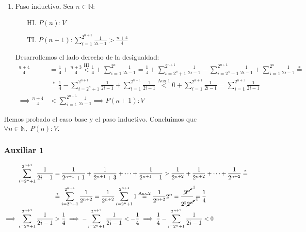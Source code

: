 \begin{enumerate}[label=\roman*)]
\begin{enumerate}[label=\arabic*)]
        \item Paso inductivo. Sea $n \in \mathbb{N}$:
        \begin{enumerate}
            \item[HI.] $P(n): V$
            \item[TI.] $P(n+1): \displaystyle \sum_{i=1}^{2^{n+1}} \frac{1}{2i-1} > \frac{n+4}{4}$ 
        \end{enumerate}

        Desarrollemos el lado derecho de la desigualdad:
        \begin{align*}
            \frac{n+4}{4} &= \frac{1}{4} + \frac{n+3}{4} \overset{\text{HI}}{<} \frac{1}{4} + \sum_{i=1}^{2^n} 
            \frac{1}{2i-1} = \frac{1}{4} + \sum_{i=2^n + 1}^{2^{n+1}} \frac{1}{2i-1} - \sum_{i=2^n + 1}^{2^{n+1}} 
            \frac{1}{2i-1} + \sum_{i=1}^{2^n} \frac{1}{2i-1} \overset{*}{=} \\
            &\overset{*}{=} \frac{1}{4} - \sum_{i=2^n + 1}^{2^{n+1}} \frac{1}{2i-1} + \sum_{i=1}^{2^{n+1}} 
            \frac{1}{2i-1} \overset{\text{Aux.1}}{<} 0 + \sum_{i=1}^{2^{n+1}} \frac{1}{2i-1} = \sum_{i=1}^{2^{n+1}} 
            \frac{1}{2i-1} \\
            \implies \frac{n+4}{4} &< \sum_{i=1}^{2^{n+1}} \frac{1}{2i-1} \implies P(n+1):V
        \end{align*}
    \end{enumerate}

    Hemos probado el caso base y el paso inductivo. Concluimos que $\forall n \in \mathbb{N}, \ P(n): V$.
    
    \subsubsection*{Auxiliar 1}
    \begin{align*}
        \sum_{i=2^n + 1}^{2^{n+1}} \frac{1}{2i-1} &= \frac{1}{2^{n+1}+1} + \frac{1}{2^{n+1}+3} + \dots 
        + \frac{1}{2^{n+1}-1} > \frac{1}{2^{n+2}} + \frac{1}{2^{n+2}} + \dots + \frac{1}{2^{n+2}} 
        \overset{*}{=}\\
        &\overset{*}{=} \sum_{i=2^n + 1}^{2^{n+1}} \frac{1}{2^{n+2}} = \frac{1}{2^{n+2}} \sum_{i=2^n + 1}^{2^{n+1}} 1 
        \overset{\text{Aux.2}}{=}
        \frac{1}{2^{n+2}} 2^n = \frac{\cancelto{1}{2^n}}{2^2\cancelto{1}{2^n}} = \frac{1}{4} \\
        \implies \sum_{i=2^n + 1}^{2^{n+1}} \frac{1}{2i-1} &> \frac{1}{4} 
        \implies -\sum_{i=2^n + 1}^{2^{n+1}} \frac{1}{2i-1} < -\frac{1}{4} 
        \implies \frac{1}{4} -\sum_{i=2^n + 1}^{2^{n+1}} \frac{1}{2i-1} < 0
    \end{align*}
    

\end{enumerate}
